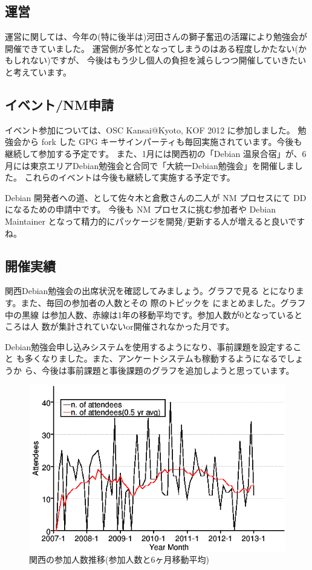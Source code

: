 \documentclass[mingoth,a4paper]{jsarticle}
\begin{document}
\subsection{運営}

運営に関しては、今年の(特に後半は)河田さんの獅子奮迅の活躍により勉強会が開催できていました。
運営側が多忙となってしまうのはある程度しかたない(かもしれない)ですが、
今後はもう少し個人の負担を減らしつつ開催していきたいと考えています。

\subsection{イベント/NM申請}

イベント参加については、OSC Kansai@Kyoto, KOF 2012 に参加しました。
勉強会から fork した GPG キーサインパーティも毎回実施されています。今後も継続して参加する予定です。
%
また、1月には関西初の「Debian 温泉合宿」が、6月には東京エリアDebian勉強会と合同で「大統一Debian勉強会」を開催しました。
これらのイベントは今後も継続して実施する予定です。

Debian 開発者への道、として佐々木と倉敷さんの二人が NM プロセスにて DD になるための申請中です。
今後も NM プロセスに挑む参加者や Debian Maintainer となって精力的にパッケージを開発/更新する人が増えると良いですね。

\subsection{開催実績}

関西Debian勉強会の出席状況を確認してみましょう。グラフで見る
とになります。また、毎回の参加者の人数とその
際のトピックを  にまとめました。グラフ中の黒線
は参加人数、赤線は1年の移動平均です。参加人数が$0$となっているところは人
数が集計されていないor開催されなかった月です。

Debian勉強会申し込みシステムを使用するようになり、事前課題を設定すること
も多くなりました。また、アンケートシステムも稼動するようになるでしょうか
ら、今後は事前課題と事後課題のグラフを追加しようと思っています。
%
\begin{figure}[h]
  \begin{center}
    \includegraphics[width=.6\hsize]{image201212/memberanalysis/kansai.png}
  \end{center}
  \caption{関西の参加人数推移(参加人数と6ヶ月移動平均)}
  \label{fig:kansaipeoplechart}
\end{figure}
\end{document}
